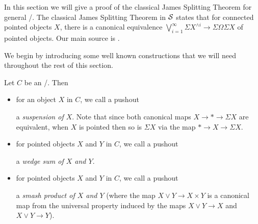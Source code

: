 In this section we will give a proof of the classical James Splitting Theorem \cite{james_splitting_original} for general \inftytops/.
The classical James Splitting Theorem in $\mathcal{S}$ states that for connected pointed objects $X$, there is a canonical equivalence $\bigvee\limits_{i=1}^{\infty}\Sigma X^{\wedge i}\to\Sigma\Omega\Sigma X$ of pointed objects.
Our main source is \cite[\S 2.2 and \S 4]{splittings_21}.

We begin by introducing some well known constructions that we will need throughout the rest of this section.
\begin{definition}
    Let $C$ be an \inftytop/.
    Then 
    \begin{itemize}
        \item for an object $X$ in $C$, we call a pushout
        \begin{center}
        \end{center}
        a \emph{suspension of $X$}. 
        Note that since both canonical maps $X\to *\to \Sigma X$ are equivalent, when $X$ is pointed then so is $\Sigma X$ via the map $*\to X\to\Sigma X$. %
        \item for pointed objects $X$ and $Y$ in $C$, we call a pushout
        \begin{center}
        \end{center}
        a \emph{wedge sum of $X$ and $Y$}.
        \item for pointed objects $X$ and $Y$ in $C$, we call a pushout
        \begin{center}
        \end{center}
        a \emph{smash product of $X$ and $Y$} (where the map $X\vee Y\to X\times Y$ is a canonical map from the universal property induced by the maps $X\vee Y\to X$ and $X\vee Y\to Y$).
    \end{itemize}
\end{definition}
